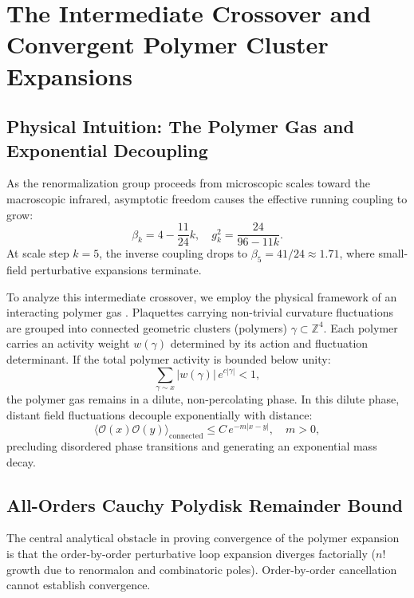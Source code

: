 \documentclass[11pt,a4paper]{article}
\theoremstyle{definition}
\theoremstyle{remark}
\newcommand{\Z}{\mathbb{Z}}
\begin{document}
\section{The Intermediate Crossover and Convergent Polymer Cluster Expansions}

\subsection{Physical Intuition: The Polymer Gas and Exponential Decoupling}
As the renormalization group proceeds from microscopic scales toward the macroscopic infrared, asymptotic freedom causes the effective running coupling to grow:
\begin{equation}
\beta_k = 4 - \frac{11}{24}k, \quad g_k^2 = \frac{24}{96 - 11k}.
\end{equation}
At scale step $k = 5$, the inverse coupling drops to $\beta_5 = 41/24 \approx 1.71$, where small-field perturbative expansions terminate.

To analyze this intermediate crossover, we employ the physical framework of an interacting polymer gas \cite{KoteckyPreiss1986}. Plaquettes carrying non-trivial curvature fluctuations are grouped into connected geometric clusters (polymers) $\gamma \subset \Z^4$. Each polymer carries an activity weight $w(\gamma)$ determined by its action and fluctuation determinant. If the total polymer activity is bounded below unity:
\begin{equation}
\sum_{\gamma \sim x} |w(\gamma)| \, e^{c |\gamma|} < 1,
\end{equation}
the polymer gas remains in a dilute, non-percolating phase. In this dilute phase, distant field fluctuations decouple exponentially with distance:
\begin{equation}
\langle \mathcal{O}(x) \mathcal{O}(y) \rangle_{\mathrm{connected}} \le C \, e^{-m |x - y|}, \quad m > 0,
\end{equation}
precluding disordered phase transitions and generating an exponential mass decay.

\subsection{All-Orders Cauchy Polydisk Remainder Bound}
The central analytical obstacle in proving convergence of the polymer expansion is that the order-by-order perturbative loop expansion diverges factorially ($n!$ growth due to renormalon and combinatoric poles). Order-by-order cancellation cannot establish convergence.
\end{document}
